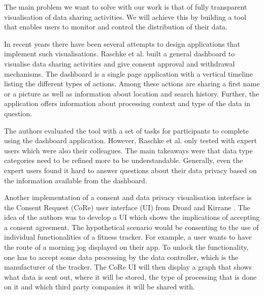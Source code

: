 \documentclass[../paper.tex]{subfiles}
\begin{document}
  The main problem we want to solve with our work is that of fully transparent
  visualisation of data sharing activities. We will achieve this by building a
  tool that enables users to monitor and control the distribution of their
  data.

  In recent years there have been several attempts to design applications that
  implement such visualisations. Raschke et al.
  \cite{core_privacy_dashboard_2018} built a general dashboard to visualise
  data sharing activities and give consent approval and withdrawal mechanisms.
  The dashboard is a single page application with a vertical timeline listing
  the different types of actions. Among these actions are sharing a first name
  or a picture as well as information about location and search history.
  Further, the application offers information about processing context and type
  of the data in question.

  The authors evaluated the tool with a set of tasks for participants to
  complete using the dashboard application. However, Raschke et al.
  \cite{core_privacy_dashboard_2018} only tested with expert users which were
  also their colleagues. The main takeaways were that data type categories
  need to be refined more to be understandable. Generally, even the expert users
  found it hard to answer questions about their data privacy based on the
  information available from the dashboard.

  Another implementation of a consent and data privacy visualisation interface
  is the Consent Request (CoRe) user interface (UI) from Drozd and Kirrane
  \cite{cure2020}.  The idea of the authors was to develop a
  UI which shows the implications of accepting a consent agreement. The
  hypothetical scenario would be consenting to the use of individual
  functionalities of a fitness tracker. For example, a user wants to have the
  route of a morning jog displayed on their app. To unlock the functionality, one
  has to accept some data processing by the data controller, which is the
  manufacturer of the tracker. The CoRe UI \cite{cure2020} will then display a
  graph that shows what data is sent out, where it will be stored, the type of
  processing that is done on it and which third party companies it will be
  shared with.
\end{document}
